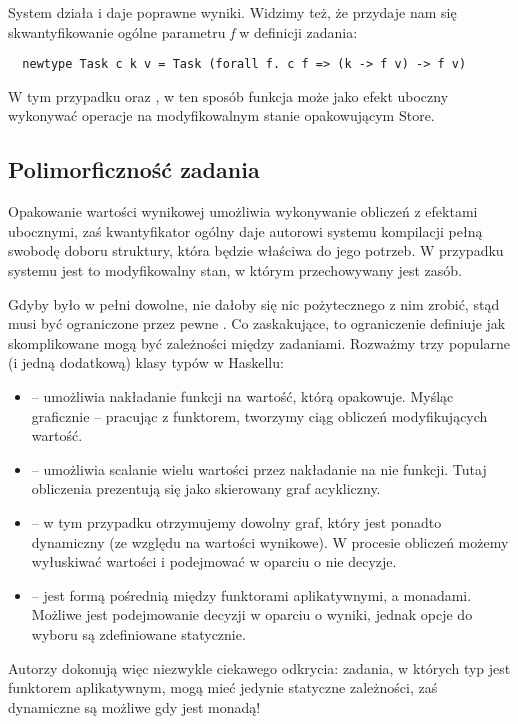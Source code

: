 System działa i daje poprawne wyniki. Widzimy też, że przydaje nam się skwantyfikowanie ogólne parametru \textit{f} w definicji zadania:

\begin{lstlisting}
  newtype Task c k v = Task (forall f. c f => (k -> f v) -> f v)
\end{lstlisting}

W tym przypadku  oraz , w ten sposób funkcja  może jako efekt uboczny wykonywać operacje na modyfikowalnym stanie opakowującym Store.

\subsection{Polimorficzność zadania}

Opakowanie wartości wynikowej umożliwia wykonywanie obliczeń z efektami ubocznymi, zaś kwantyfikator ogólny daje autorowi systemu kompilacji pełną swobodę doboru struktury, która będzie właściwa do jego potrzeb. W przypadku systemu  jest to modyfikowalny stan, w którym przechowywany jest zasób.

Gdyby  było w pełni dowolne, nie dałoby się nic pożytecznego z nim zrobić, stąd musi być ograniczone przez pewne . Co zaskakujące, to ograniczenie definiuje jak skomplikowane mogą być zależności między zadaniami. Rozważmy trzy popularne (i jedną dodatkową) klasy typów w Haskellu:
\begin{itemize}
\item {} -- umożliwia nakładanie funkcji na wartość, którą opakowuje. Myśląc graficznie -- pracując z funktorem, tworzymy ciąg obliczeń modyfikujących wartość.
\item {} -- umożliwia scalanie wielu wartości przez nakładanie na nie funkcji. Tutaj obliczenia prezentują się jako skierowany graf acykliczny.
\item {} -- w tym przypadku otrzymujemy dowolny graf, który jest ponadto dynamiczny (ze względu na wartości wynikowe). W procesie obliczeń możemy wyłuskiwać wartości i podejmować w oparciu o nie decyzje.
\item {}\cite{mokhov2019selective} -- jest formą pośrednią między funktorami aplikatywnymi, a monadami. Możliwe jest podejmowanie decyzji w oparciu o wyniki, jednak opcje do wyboru są zdefiniowane statycznie.
\end{itemize}

Autorzy dokonują więc niezwykle ciekawego odkrycia: zadania, w których typ  jest funktorem aplikatywnym, mogą mieć jedynie statyczne zależności, zaś dynamiczne są możliwe gdy  jest monadą!

